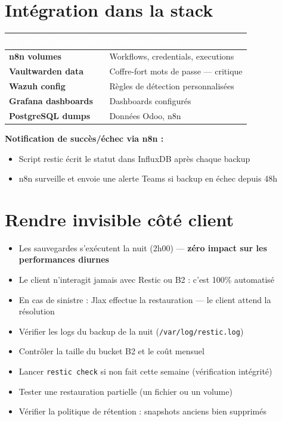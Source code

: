 \documentclass[11pt, a4paper]{article}
\begin{document}
\section{Intégration dans la stack}

\begin{center}
\renewcommand{\arraystretch}{1.4}
\begin{tabularx}{\linewidth}{>{\bfseries}p{2.8cm} X}
\toprule
\rowcolor{tabheader}
\textcolor{white}{\textbf{Ce qui est sauvegardé}} & \textcolor{white}{\textbf{Contenu critique}} \\
\midrule
n8n volumes & Workflows, credentials, executions \\
\rowcolor{rowgray}
Vaultwarden data & Coffre-fort mots de passe — critique \\
Wazuh config & Règles de détection personnalisées \\
\rowcolor{rowgray}
Grafana dashboards & Dashboards configurés \\
PostgreSQL dumps & Données Odoo, n8n \\
\bottomrule
\end{tabularx}
\end{center}

\textbf{Notification de succès/échec via n8n :}
\begin{itemize}
  \item Script restic écrit le statut dans InfluxDB après chaque backup
  \item n8n surveille et envoie une alerte Teams si backup en échec depuis 48h
\end{itemize}

\section{Rendre invisible côté client}

\begin{itemize}
  \item Les sauvegardes s'exécutent la nuit (2h00) — \textbf{zéro impact sur les performances diurnes}
  \item Le client n'interagit jamais avec Restic ou B2 : c'est 100\% automatisé
  \item En cas de sinistre : Jlax effectue la restauration — le client attend la résolution
\end{itemize}

\begin{checklist}
  \begin{itemize}
    \item[$\square$] Vérifier les logs du backup de la nuit (\texttt{/var/log/restic.log})
    \item[$\square$] Contrôler la taille du bucket B2 et le coût mensuel
    \item[$\square$] Lancer \texttt{restic check} si non fait cette semaine (vérification intégrité)
    \item[$\square$] Tester une restauration partielle (un fichier ou un volume)
    \item[$\square$] Vérifier la politique de rétention : snapshots anciens bien supprimés
  \end{itemize}
\end{checklist}
\end{document}
